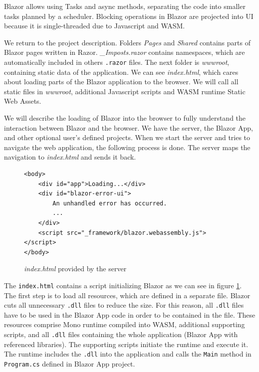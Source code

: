 Blazor allows using Tasks and async methods, separating the code into smaller tasks planned by a scheduler.
Blocking operations in Blazor are projected into UI because it is single-threaded due to Javascript and WASM.
\par
We return to the project description. 
Folders \textit{Pages} and \textit{Shared} contains parts of Blazor pages written in Razor.
\textit{\_Imposts.razor} contains namespaces, which are automatically included in others \texttt{.razor} files.
The next folder is \textit{wwwroot}, containing static data of the application.
We can see \textit{index.html}, which cares about loading parts of the Blazor application to the browser.
We will call all static files in \textit{wwwroot}, additional Javascript scripts and WASM runtime Static Web Assets.
\par
We will describe the loading of Blazor into the browser to fully understand the interaction between Blazor and the browser.
We have the server, the Blazor App, and other optional user's defined projects. 
When we start the server and tries to navigate the web application, the following process is done.
The server maps the navigation to \textit{index.html} and sends it back.
\par
\begin{figure}
\begin{lstlisting}
<body>
    <div id="app">Loading...</div>
    <div id="blazor-error-ui">
        An unhandled error has occurred.
		...
    </div>
    <script src="_framework/blazor.webassembly.js"></script>
</body>

\end{lstlisting}
\caption{\textit{index.html} provided by the server}
\label{img07:index}
\end{figure}
\par 
The \texttt{index.html} contains a script initializing Blazor as we can see in figure \ref{img07:index}.
The first step is to load all resources, which are defined in a separate file.
Blazor cuts all unnecessary \texttt{.dll} files to reduce the size.
For this reason, all \texttt{.dll} files have to be used in the Blazor App code in order to be contained in the file. 
These resources comprise Mono runtime compiled into WASM, additional supporting scripts, and all \texttt{.dll} files containing the whole application (Blazor App with referenced libraries).
The supporting scripts initiate the runtime and execute it.
The runtime includes the \texttt{.dll} into the application and calls the \texttt{Main} method in \texttt{Program.cs} defined in Blazor App project.
